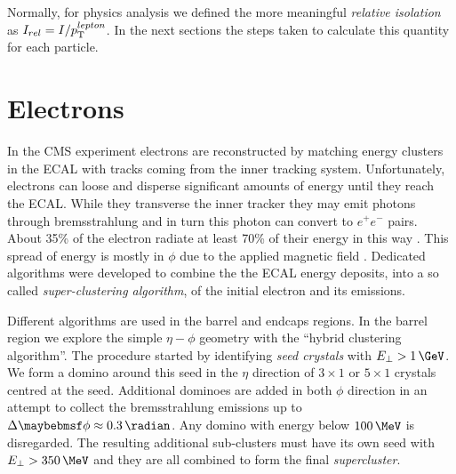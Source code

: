 Normally, for physics analysis we defined the more meaningful \textit{relative isolation} as $I_{rel} = I/p_{\mathrm{T}}^{lepton}$. In the next sections the steps taken to calculate this quantity for each particle.

\section{Electrons}
\label{SECTION:EventReconstructionAndSimulation_Electrons}


In the \gls{CMS} experiment electrons are reconstructed by matching energy clusters in the \gls{ECAL} with tracks coming from the inner tracking system. Unfortunately, electrons can loose and disperse significant amounts of energy until they reach the \gls{ECAL}. While they transverse the inner tracker they may emit photons through bremsstrahlung and in turn this photon can convert to $e^+e^-$ pairs. About 35\% of the electron radiate at least 70\% of their energy in this way \cite{ARTICLE:CMSElectronReconstruction}. This spread of energy is mostly in $\phi$ due to the applied magnetic field \cite{ARTICLE:CMSElectronReconstructionECAL}. Dedicated algorithms were developed to combine the the \gls{ECAL} energy deposits, into a so called \textit{super-clustering algorithm}, of the initial electron and its emissions.

Different algorithms are used in the barrel and endcaps regions. In the barrel region we explore the simple $\eta-\phi$ geometry with the ``hybrid clustering algorithm''. The procedure started by identifying \textit{seed crystals} with $E_\perp>1\,\GeV$. We form a domino around this seed in the $\eta$ direction of $3 \times 1$ or $5 \times 1$ crystals centred at the seed. Additional dominoes are added in both $\phi$ direction in an attempt to collect the bremsstrahlung emissions up to $\Delta\phi \approx 0.3\,\radian$. Any domino with energy below $100\,\MeV$ is disregarded. The resulting additional sub-clusters must have its own seed with $E_\perp>350\,\MeV$ and they are all combined to form the final \textit{supercluster}. 

